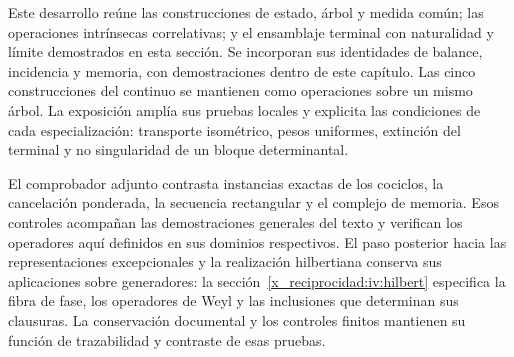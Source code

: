 Este desarrollo reúne las construcciones de estado, árbol y medida común; las operaciones intrínsecas correlativas; y el ensamblaje terminal con naturalidad y límite demostrados en esta sección. Se incorporan sus identidades de balance, incidencia y memoria, con demostraciones dentro de este capítulo. Las cinco construcciones del continuo se mantienen como operaciones sobre un mismo árbol. La exposición amplía sus pruebas locales y explicita las condiciones de cada especialización: transporte isométrico, pesos uniformes, extinción del terminal y no singularidad de un bloque determinantal.

El comprobador adjunto contrasta instancias exactas de los cociclos, la cancelación ponderada, la secuencia rectangular y el complejo de memoria. Esos controles acompañan las demostraciones generales del texto y verifican los operadores aquí definidos en sus dominios respectivos. El paso posterior hacia las representaciones excepcionales y la realización hilbertiana conserva sus aplicaciones sobre generadores: la sección~\ref{x_reciprocidad:iv:hilbert} especifica la fibra de fase, los operadores de Weyl y las inclusiones que determinan sus clausuras. La conservación documental y los controles finitos mantienen su función de trazabilidad y contraste de esas pruebas.
